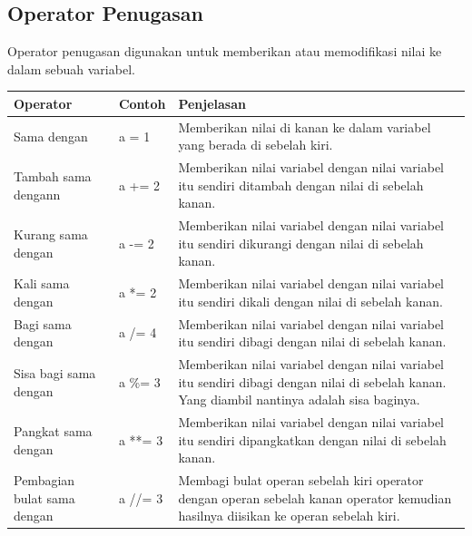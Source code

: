 \subsection{Operator Penugasan}
Operator penugasan digunakan untuk memberikan atau memodifikasi nilai ke dalam sebuah variabel.
\begin{center}
\begin{tabular}{ | m{2cm} | m{2cm} | m{7cm} | }
\hline
Operator & Contoh & Penjelasan \\
\hline
Sama dengan & a = 1 & Memberikan nilai di kanan ke dalam variabel yang berada di sebelah kiri. \\
\hline
Tambah sama dengann & a += 2 & Memberikan nilai variabel dengan nilai variabel itu sendiri ditambah dengan nilai di sebelah kanan. \\
\hline
Kurang sama dengan & a -= 2 & Memberikan nilai variabel dengan nilai variabel itu sendiri dikurangi dengan nilai di sebelah kanan. \\
\hline
Kali sama dengan & a *= 2 & Memberikan nilai variabel dengan nilai variabel itu sendiri dikali dengan nilai di sebelah kanan. \\
\hline
Bagi sama dengan & a /= 4 & Memberikan nilai variabel dengan nilai variabel itu sendiri dibagi dengan nilai di sebelah kanan. \\
\hline
Sisa bagi sama dengan & a \%= 3 & Memberikan nilai variabel dengan nilai variabel itu sendiri dibagi dengan nilai di sebelah kanan. Yang diambil nantinya adalah sisa baginya.\\
\hline
Pangkat sama dengan & a **= 3 & Memberikan nilai variabel dengan nilai variabel itu sendiri dipangkatkan dengan nilai di sebelah kanan. \\
\hline
Pembagian bulat sama dengan & a //= 3 & Membagi bulat operan sebelah kiri operator dengan operan sebelah kanan operator kemudian hasilnya diisikan ke operan sebelah kiri. \\
\hline
\end{tabular}
\end{center}

